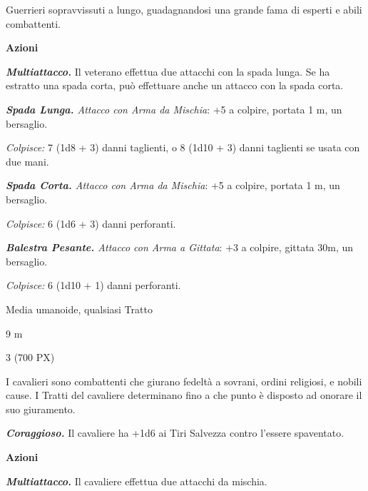\begin{multicols}{2}
{Guerrieri sopravvissuti a lungo, guadagnandosi una grande fama di esperti e abili combattenti.

\textbf{Azioni}

\emph{\textbf{Multiattacco.}} Il veterano effettua due attacchi con la spada lunga. Se ha estratto una spada corta, può effettuare anche un attacco con la spada corta.

\emph{\textbf{Spada Lunga.} Attacco con Arma da Mischia}: +5 a colpire, portata 1 m, un bersaglio.

\emph{Colpisce:} 7 (1d8 + 3) danni taglienti, o 8 (1d10 + 3) danni taglienti se usata con due mani.

\emph{\textbf{Spada Corta.} Attacco con Arma da Mischia}: +5 a colpire, portata 1 m, un bersaglio.

\emph{Colpisce:} 6 (1d6 + 3) danni perforanti.

\emph{\textbf{Balestra Pesante.} Attacco con Arma a Gittata}: +3 a colpire, gittata 30m, un bersaglio.

\emph{Colpisce:} 6 (1d10 + 1) danni perforanti.

\begin{description}[noitemsep, topsep=0pt, parsep=0pt, partopsep=0pt, itemsep=1pt, leftmargin=2.35cm,  labelwidth=2.2cm, itemindent=0cm, listparindent=0pt] %
\setlength{\baselineskip}{10pt}
\item[\textbf{Taglia/Tipo}] Media umanoide, qualsiasi Tratto
\item[\textbf{Caratt.}] 
\item[\textbf{Punti Ferita}] 
\item[\textbf{Tiri Salvez.}] 
\item[\textbf{Movimento}] 9 m
\item[\textbf{Sfida}] 3 (700 PX)
\end{description}
\smallskip

I cavalieri sono combattenti che giurano fedeltà a sovrani, ordini religiosi, e nobili cause. I Tratti del cavaliere determinano fino a che punto è disposto ad onorare il suo giuramento.

\emph{\textbf{Coraggioso.}} Il cavaliere ha +1d6 ai Tiri Salvezza contro l'essere spaventato.

\textbf{Azioni}

\emph{\textbf{Multiattacco.}} Il cavaliere effettua due attacchi da mischia.

}
\end{multicols}
